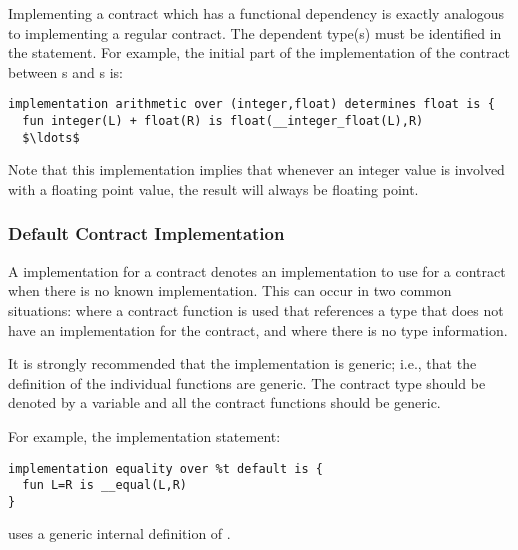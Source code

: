 Implementing a contract which has a functional dependency is exactly analogous to implementing a regular contract. The dependent type(s) must be identified in the  statement. For example, the initial part of the implementation of the  contract between s and s is:
\begin{lstlisting}[mathescape=true]
implementation arithmetic over (integer,float) determines float is {
  fun integer(L) + float(R) is float(__integer_float(L),R)
  $\ldots$
\end{lstlisting}
Note that this implementation implies that whenever an integer value is involved with a floating point value, the result will always be floating point.

\subsubsection{Default Contract Implementation}
\label{defaultImplementation}

A  implementation for a contract denotes an implementation to use for a contract when there is no known implementation. This can occur in two common situations: where a contract function is used that references a type that does not have an implementation for the contract, and where there is no type information.

\begin{aside}
It is strongly recommended that the  implementation is generic; i.e., that the definition of the individual functions are generic. The contract type should be denoted by a variable and all the contract functions should be generic.

For example, the implementation statement:
\begin{lstlisting}
implementation equality over %t default is {
  fun L=R is __equal(L,R)
}
\end{lstlisting}
uses a generic internal definition of .
\end{aside}


